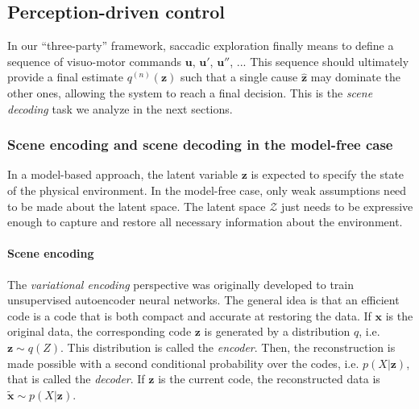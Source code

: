 \documentclass[12pt,twoside,openright]{article}
\begin{document}



 




\subsection{Perception-driven control}\label{sec:perception-driven-control}

In our ``three-party'' framework, 
saccadic exploration finally means to define a sequence of visuo-motor commands $\boldsymbol{u}$, $\boldsymbol{u}'$, $\boldsymbol{u}''$, ... This sequence should ultimately provide a final estimate $q^{(n)}(\boldsymbol{z})$ such that a single cause $\hat{\boldsymbol{z}}$ may dominate the other ones, allowing the system to reach a final decision. This is the \emph{scene decoding} task we analyze in the next sections.

\subsubsection{Scene encoding and scene decoding in the model-free case}

In a model-based approach, the latent variable $\boldsymbol{z}$ is expected to specify the state of the physical environment. In the model-free case, only weak assumptions need to be made about the latent space.  The latent space $\mathcal{Z}$ just needs to be expressive enough to capture and restore all necessary information about the environment.  

\paragraph{Scene encoding}\label{sec:encoding}
The \emph{variational encoding} perspective \cite{hinton1994autoencoders} was originally developed 
to train unsupervised autoencoder neural networks. The general idea is that an efficient code 
is a code that is both compact and accurate at restoring the data. 
If $\boldsymbol{x}$ is the original data, the corresponding code $\boldsymbol{z}$ is generated by a distribution $q$, i.e. $\boldsymbol{z} \sim q(Z)$. This distribution is called the \emph{encoder}. Then, the reconstruction is made possible with a second conditional probability over the codes, i.e. $p(X|\boldsymbol{z})$, that is called the \emph{decoder}. If $\boldsymbol{z}$ is the current code, the reconstructed data is $\tilde{\boldsymbol{x}} \sim p(X|\boldsymbol{z})$. 
 
\end{document}
